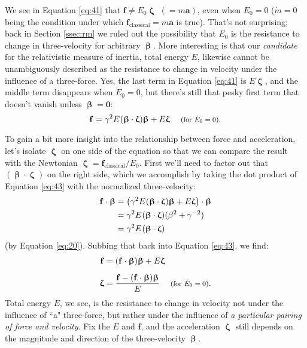 \documentclass[12pt]{article}
\renewcommand{\vv}[1]{\mathbf{#1}}
\newcommand{\vvbeta}{\bm{\upbeta}}
\newcommand{\vvzeta}{\bm{\upzeta}}
\begin{document}
We see in Equation \ref{eq:41} that $\vv f \neq E_0 \vvzeta$ $( = m \vv a)$, even when $\dot{E}_0 = 0$ ($\dot{m} = 0$ being the condition under which $\vv f_\textrm{classical} = m \vv a$ is true). That's not surprising; back in Section \ref{ssec:rm} we ruled out the possibility that $E_0$ is the resistance to change in three-velocity for arbitrary $\vvbeta$. More interesting is that our \emph{candidate} for the relativistic measure of inertia, total energy $E$, likewise cannot be unambiguously described as the resistance to change in velocity under the influence of a three-force. Yes, the last term in Equation \ref{eq:41} is $E \vvzeta$, and the middle term disappears when $\dot{E}_0 = 0$, but there's still that pesky first term that doesn't vanish unless $\vvbeta = \vv 0$:
\begin{equation}\label{eq:43}
\vv f = \gamma^2 E \mkern1mu (\vvbeta \cdot \vvzeta) \vvbeta + E \vvzeta \quad \textrm{\footnotesize{ (for $\dot{E}_0 = 0$)}}.
\end{equation}

To gain a bit more insight into the relationship between force and acceleration, let's isolate $\vvzeta$ on one side of the equation so that we can compare the result with the Newtonian $\vvzeta = \vv f_{\mathrm{classical}} / E_0$. First we'll need to factor out that $(\vvbeta \cdot \vvzeta)$ on the right side, which we accomplish by taking the dot product of Equation \ref{eq:43} with the normalized three-velocity:
\begin{equation*}
\begin{split}
\vv f \cdot \vvbeta &= \left( \gamma^2 E \mkern1mu (\vvbeta \cdot \vvzeta) \vvbeta + E \vvzeta \right) \cdot \vvbeta \\
&= \gamma^2 E \mkern1mu (\vvbeta \cdot \vvzeta)(\beta^2 + \gamma^{-2}) \\
&= \gamma^2 E \mkern1mu (\vvbeta \cdot \vvzeta)
\end{split}
\end{equation*}
(by Equation \ref{eq:20}). Subbing that back into Equation \ref{eq:43}, we find:
\begin{equation}\label{eq:44}
\begin{split}
\vv f &= (\vv f \cdot \vvbeta) \vvbeta + E \vvzeta \\[5pt]
\vvzeta &= \frac{\vv f - (\vv f \cdot \vvbeta) \vvbeta}{E} \quad \textrm{\footnotesize{ (for $\dot{E}_0 = 0$)}}.
\end{split}
\end{equation}
Total energy $E$, we see, is the resistance to change in velocity not under the influence of ``a" three-force, but rather under the influence of \emph{a particular pairing of force and velocity}. Fix the $E$ and $\vv f$, and the acceleration $\vvzeta$ still depends on the magnitude and direction of the three-velocity $\vvbeta$.
\end{document}
